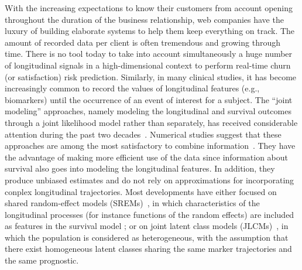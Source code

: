 \documentclass[11pt]{article}
\begin{document}
With the increasing expectations to know their customers from account opening throughout the duration of the business relationship, web companies have the luxury of building elaborate systems to help them keep everything on track. The amount of recorded data per client is often tremendous and growing through time. There is no tool today to take into account simultaneously a huge number of longitudinal signals in a high-dimensional context to perform real-time churn (or satisfaction) risk prediction.
Similarly, in many clinical studies, it has become increasingly common to record the values of longitudinal features (e.g., biomarkers) until the occurrence of an event of interest for a subject. The ``joint modeling'' approaches, namely modeling the longitudinal and survival outcomes through a joint likelihood model rather than separately, has received considerable attention during the past two decades~\citep{tsiatis2004joint}. Numerical studies suggest that these approaches are among the most satisfactory to combine information~\citep{yu2004joint}. They have the advantage of making more efficient use of the data since information about survival also goes into modeling the longitudinal features. In addition, they produce unbiased estimates and do not rely on approximations for incorporating conplex longitudinal trajectories. Most developments have either focused on shared random-effect models (SREMs)~\citep{wulfsohn1997joint}, in which characteristics of the longitudinal processes (for instance functions of the random effects) are included as features in the survival model ; or on joint latent class models (JLCMs)~\citep{vermunt2003latent}, in which the population is considered as heterogeneous, with the assumption that there exist homogeneous latent classes sharing the same marker trajectories and the same prognostic.
\end{document}
